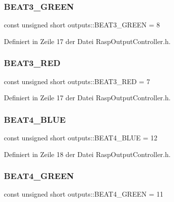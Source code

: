\subsubsection{\texorpdfstring{B\+E\+A\+T3\+\_\+\+G\+R\+E\+EN}{BEAT3\_GREEN}}
{\footnotesize\ttfamily const unsigned short outputs\+::\+B\+E\+A\+T3\+\_\+\+G\+R\+E\+EN = 8}



Definiert in Zeile 17 der Datei Rasp\+Output\+Controller.\+h.

\mbox{\label{namespaceoutputs_a0c48c063f394a0735f24036e932bff2b}} 
\subsubsection{\texorpdfstring{B\+E\+A\+T3\+\_\+\+R\+ED}{BEAT3\_RED}}
{\footnotesize\ttfamily const unsigned short outputs\+::\+B\+E\+A\+T3\+\_\+\+R\+ED = 7}



Definiert in Zeile 17 der Datei Rasp\+Output\+Controller.\+h.

\mbox{\label{namespaceoutputs_aa66f074e1960dc7dbf507acdf6cc5ae3}} 
\subsubsection{\texorpdfstring{B\+E\+A\+T4\+\_\+\+B\+L\+UE}{BEAT4\_BLUE}}
{\footnotesize\ttfamily const unsigned short outputs\+::\+B\+E\+A\+T4\+\_\+\+B\+L\+UE = 12}



Definiert in Zeile 18 der Datei Rasp\+Output\+Controller.\+h.

\mbox{\label{namespaceoutputs_afd9270436632213bade739dbc4f6c8f6}} 
\subsubsection{\texorpdfstring{B\+E\+A\+T4\+\_\+\+G\+R\+E\+EN}{BEAT4\_GREEN}}
{\footnotesize\ttfamily const unsigned short outputs\+::\+B\+E\+A\+T4\+\_\+\+G\+R\+E\+EN = 11}



